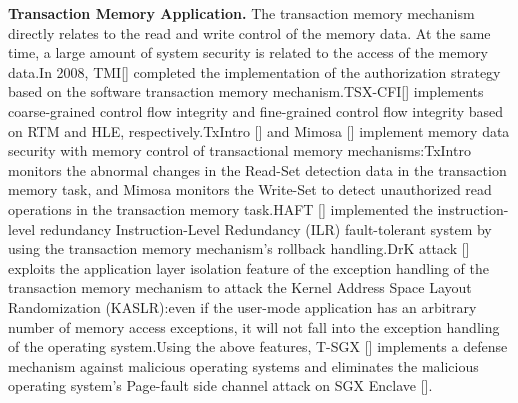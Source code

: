 \textbf{Transaction Memory Application.}
The transaction memory mechanism directly relates to the read and write control of the memory data. At the same time, a large amount of system security is related to the access of the memory data.In 2008, TMI[] completed the implementation of the authorization strategy based on the software transaction memory mechanism.TSX-CFI[] implements coarse-grained control flow integrity and fine-grained control flow integrity based on RTM and HLE, respectively.TxIntro [] and Mimosa [] implement memory data security with memory control of transactional memory mechanisms:TxIntro monitors the abnormal changes in the Read-Set detection data in the transaction memory task, and Mimosa monitors the Write-Set to detect unauthorized read operations in the transaction memory task.HAFT [] implemented the instruction-level redundancy Instruction-Level Redundancy (ILR) fault-tolerant system by using the transaction memory mechanism's rollback handling.DrK attack [] exploits the application layer isolation feature of the exception handling of the transaction memory mechanism to attack the Kernel Address Space Layout Randomization (KASLR):even if the user-mode application has an arbitrary number of memory access exceptions, it will not fall into the exception handling of the operating system.Using the above features, T-SGX [] implements a defense mechanism against malicious operating systems and eliminates the malicious operating system's Page-fault side channel attack on SGX Enclave [].
